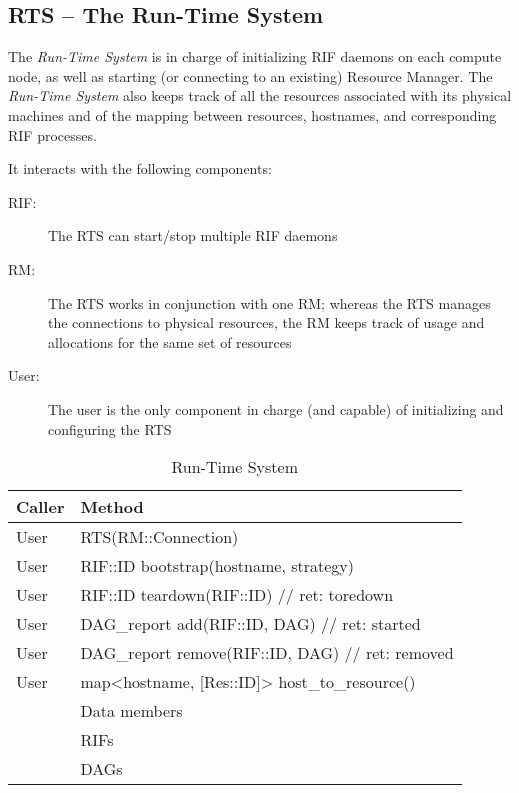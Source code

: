 \documentclass[10pt]{article}
\newcommand{\user}{User\xspace}
\newcommand{\rts}{RTS\xspace}
\newcommand{\rman}{RM\xspace}
\newcommand{\rif}{RIF\xspace}
\newcommand{\rdag}{DAG\xspace}
\newcommand{\rdagrep}{DAG\_report\xspace}
\newcommand{\res}{Res\xspace}
\newcommand{\id}{::ID\xspace}
\newcommand{\conn}{::Connection\xspace}
\begin{document}
\subsection{RTS -- The Run-Time System}
The \emph{Run-Time System} is in charge of initializing RIF daemons on each
compute node, as well as starting (or connecting to an existing) Resource
Manager.
The \emph{Run-Time System} also keeps track of all the resources associated with
its physical machines and of the mapping between resources, hostnames, and
corresponding RIF processes.

It interacts with the following components:
\begin{description}
    \item [\rif:] The \rts can start/stop multiple \rif daemons
    \item [\rman:] The \rts works in conjunction with one \rman; whereas the
    \rts manages the connections to physical resources, the \rman keeps track of
    usage and allocations for the same set of resources  
    \item [\user:] The user is the only component in charge (and capable) of
    initializing and configuring the \rts
\end{description}
%
\begin{table}[ht]
    \centering
    \caption{Run-Time System}
    \label{tab:rts}
    \bgroup
    \setlength{\tabcolsep}{2em}
    \begin{tabular}{ll}
        \toprule
        Caller & Method \\
        \midrule
        \user & \rts(\rman\conn) \\
        \user & \rif\id bootstrap(hostname, strategy) \\
        \user & \rif\id teardown(\rif\id)    // ret: toredown \\
        \user & \rdagrep add(\rif\id, \rdag) // ret: started \\
        \user & \rdagrep remove(\rif\id, \rdag) // ret: removed \\
        \user & map<hostname, [\res\id]> host\_to\_resource() \\
        \midrule
        & Data members \\        
        \midrule
        & RIFs \\
        & DAGs \\
        \bottomrule
    \end{tabular}
    \egroup
\end{table}
%
\end{document}
